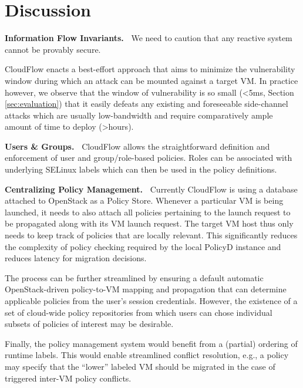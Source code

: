 \section{Discussion}

\noindent 
{\bf Information Flow Invariants.~}
We need to caution that any reactive system cannot
be provably secure. 

CloudFlow enacts a best-effort approach that aims to minimize the
vulnerability window during which an attack can be mounted against a target
VM.  In practice however, we observe that the window of vulnerability is so
small (\textless 5ms, Section \ref{sec:evaluation}) that it easily defeats any
existing and foreseeable side-channel attacks which are usually low-bandwidth
and require comparatively ample amount of time to deploy \cite{SideCrypto,SideCloud,PrimeProbe12}
(\textgreater hours).

\noindent
{\bf Users \& Groups.~}
%
CloudFlow allows the straightforward definition and enforcement of user and
group/role-based policies. Roles can be associated with underlying SELinux
labels which can then be used in the policy definitions. 

\noindent
{\bf Centralizing Policy Management.~}
%
Currently CloudFlow is using a database attached to OpenStack as a Policy
Store.  Whenever a particular VM is being launched, it needs to also attach
all policies pertaining to the launch request to be propagated along with its VM launch
request.  The target VM host thus only needs to keep track of policies that
are locally relevant.  This significantly reduces the complexity of policy
checking required by the local PolicyD instance and reduces latency for
migration decisions.

The process can be further streamlined by ensuring a default automatic
OpenStack-driven policy-to-VM mapping and propagation that can determine
applicable policies from the user's session credentials. However, the
existence of a set of cloud-wide policy repositories from
which users can chose individual subsets of policies of interest may be desirable. 

Finally, the policy management system would benefit from a (partial)
ordering of runtime labels.  This would enable streamlined conflict
resolution, e.g., a policy may specify that the ``lower'' labeled VM
should be migrated in the case of triggered inter-VM policy conflicts.


